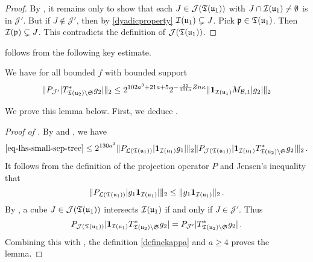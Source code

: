     \begin{proof}\leanok
        By , it remains only to show that each $J \in \mathcal{J}({\mathfrak T}({\mathfrak u}_1))$ with $J \cap {\mathcal{I}}({\mathfrak u}_1) \ne \emptyset$ is in $\mathcal{J}'$. But if $J \notin \mathcal{J}'$, then by \eqref{dyadicproperty} ${\mathcal{I}}({\mathfrak u}_1) \subsetneq J$. Pick ${\mathfrak p} \in {\mathfrak T}({\mathfrak u}_1)$. Then ${\mathcal{I}}({\mathfrak p}) \subsetneq J$. This contradicts the definition of $\mathcal{J}({\mathfrak T}({\mathfrak u}_1))$.
    \end{proof}

     follows from the following key estimate.

    \begin{lemma}
        \label{bound-for-tree-projection}
        \leanok
        We have for all bounded $f$ with bounded support
        $$
            \|P_{\mathcal{J}'}|T_{{\mathfrak T}({\mathfrak u}_2) \setminus \mathfrak{S}}^* g_2|\|_2
            \le 2^{102a^3+21a+5} 2^{-\frac{25}{101a}Zn\kappa} \|\mathbf{1}_{{\mathcal{I}}({\mathfrak u}_1)} M_{\mathcal{B},1} |g_2|\|_2
        $$
    \end{lemma}

    We prove this lemma below. First, we deduce .

    \begin{proof}[Proof of ]
        \leanok
        By  and , we have
        \begin{align*}
            \eqref{eq-lhs-small-sep-tree} \le 2^{130a^3} \|P_{\mathcal{L}({\mathfrak T}({\mathfrak u}_1))} |\mathbf{1}_{{\mathcal{I}}({\mathfrak u}_1)}g_1| \|_2 \|P_{\mathcal{J}({\mathfrak T}({\mathfrak u}_1) )}|\mathbf{1}_{{\mathcal{I}}({\mathfrak u}_1)} T_{{\mathfrak T}({\mathfrak u}_2) \setminus \mathfrak{S}}^* g_2|\|_2\,.
        \end{align*}
        It follows from the definition of the projection operator $P$ and Jensen's inequality that
        $$
            \|P_{\mathcal{L}({\mathfrak T}({\mathfrak u}_1))} |g_1\mathbf{1}_{{\mathcal{I}}({\mathfrak u}_1)}| \|_2 \le \|g_1 \mathbf{1}_{{\mathcal{I}}({\mathfrak u}_1)}\|_2\,.
        $$
        By , a cube $J \in \mathcal{J}({\mathfrak T}({\mathfrak u}_1))$ intersects ${\mathcal{I}}({\mathfrak u}_1)$ if and only if $J \in \mathcal{J}'$. Thus
        $$
            P_{\mathcal{J}({\mathfrak T}({\mathfrak u}_1) )}|\mathbf{1}_{{\mathcal{I}}({\mathfrak u}_1)} T_{{\mathfrak T}({\mathfrak u}_2) \setminus \mathfrak{S}}^* g_2| = P_{\mathcal{J}'}|T_{{\mathfrak T}({\mathfrak u}_2) \setminus \mathfrak{S}}^* g_2|\,.
        $$
        Combining this with , the definition \eqref{definekappa} and $a \ge 4$ proves the lemma.
    \end{proof}

